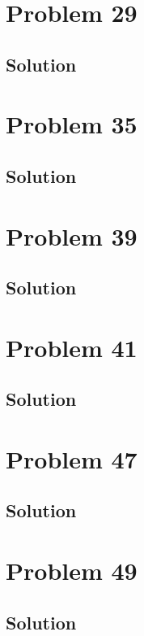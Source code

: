 \documentclass[12pt]{article}
\begin{document}
    \section{Problem 29}

        \subsection{Solution}

    \pagebreak
    \section{Problem 35}

        \subsection{Solution}

    \pagebreak
    \section{Problem 39}

        \subsection{Solution}

    \pagebreak
    \section{Problem 41}

        \subsection{Solution}

    \pagebreak
    \section{Problem 47}

        \subsection{Solution}

    \pagebreak
    \section{Problem 49}

        \subsection{Solution}
\end{document}
